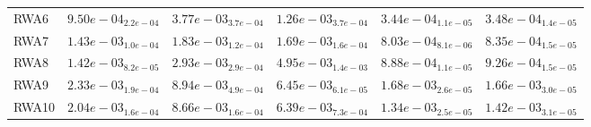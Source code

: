 \documentclass{article}
\begin{document}
\begin{table}
\begin{scriptsize}
\begin{tabular}{llllll}
RWA6 & $  9.50e-04_{ 2.2e-04}$ & $  3.77e-03_{ 3.7e-04}$ & $  1.26e-03_{ 3.7e-04}$ & \cellcolor{gray95}$  3.44e-04_{ 1.1e-05}$ & \cellcolor{gray25}$  3.48e-04_{ 1.4e-05}$ \\
RWA7 & $  1.43e-03_{ 1.0e-04}$ & $  1.83e-03_{ 1.2e-04}$ & $  1.69e-03_{ 1.6e-04}$ & \cellcolor{gray95}$  8.03e-04_{ 8.1e-06}$ & \cellcolor{gray25}$  8.35e-04_{ 1.5e-05}$ \\
RWA8 & $  1.42e-03_{ 8.2e-05}$ & $  2.93e-03_{ 2.9e-04}$ & $  4.95e-03_{ 1.4e-03}$ & \cellcolor{gray95}$  8.88e-04_{ 1.1e-05}$ & \cellcolor{gray25}$  9.26e-04_{ 1.5e-05}$ \\
RWA9 & $  2.33e-03_{ 1.9e-04}$ & $  8.94e-03_{ 4.9e-04}$ & $  6.45e-03_{ 6.1e-05}$ & \cellcolor{gray25}$  1.68e-03_{ 2.6e-05}$ & \cellcolor{gray95}$  1.66e-03_{ 3.0e-05}$ \\
RWA10 & $  2.04e-03_{ 1.6e-04}$ & $  8.66e-03_{ 1.6e-04}$ & $  6.39e-03_{ 7.3e-04}$ & \cellcolor{gray95}$  1.34e-03_{ 2.5e-05}$ & \cellcolor{gray25}$  1.42e-03_{ 3.1e-05}$ \\
\hline
\end{tabular}
\end{scriptsize}
\end{table}
\end{document}
